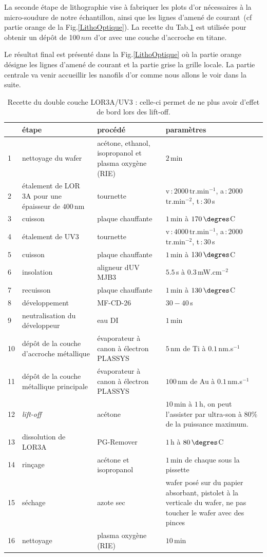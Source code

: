 La seconde étape de lithographie vise à fabriquer les plots d'or nécessaires à la micro-soudure de notre échantillon, ainsi que les lignes d'amené de courant~(cf partie orange de la Fig.\ref{LithoOptique}). La recette du Tab.\ref{tab_recette}  est utilisée pour obtenir un dép\^ot de 100$\,nm$ d'or avec une couche d'accroche en titane. 


Le résultat final est présenté dans la Fig.\ref{LithoOptique} où la partie orange désigne les lignes d'amené de courant et la partie grise la grille locale. La partie centrale va venir accueillir les nanofils d'or comme nous allons le voir dans la suite.



\begin{table}
\begin{center}
\begin{tabular}{|p{0.5cm}|p{4cm}|p{4cm}|p{3cm}|}
  \hline
\,& \textbf{étape} & \textbf{procédé} & \textbf{paramètres} \tabularnewline
\hline
1 &  nettoyage du wafer & acétone, ethanol, isopropanol et plasma oxygène (RIE)& $2\,$min \tabularnewline
\hline
 2 & étalement de LOR 3A pour une épaisseur de $400\,$nm& tournette & v\,:\,$2000\,$tr.min$^{-1}$, a\,:\,$2000\,$tr.min$^{-2}$, t\,:\,$30\,$s \tabularnewline
\hline
 3 & cuisson & plaque chauffante & $1\,$min à $170\,\degres$C \tabularnewline
\hline
4 & étalement de UV3 & tournette & v\,:\,$4000\,$tr.min$^{-1}$, a\,:\,$2000\,$tr.min$^{-2}$, t\,:\,$30\,$s \tabularnewline
\hline
5 & cuisson & plaque chauffante & $1\,$min à $130\,\degres$C \tabularnewline
\hline
6 & insolation & aligneur dUV MJB3 & $5.5\,$s à $0.3\,$mW.cm$^{-2}$\tabularnewline
\hline
7 & recuisson & plaque chauffante & $1\,$min à $130\,\degres$C \tabularnewline
\hline
8 & développement & MF-CD-26 & $30-40\,$s\tabularnewline
\hline
9 & neutralisation du développeur & eau DI & $1\,$min\tabularnewline
\hline
10 & dépôt de la couche d'accroche métallique & évaporateur à canon à électron PLASSYS & $5\,$nm de Ti à $0.1\,$nm.s$^{-1}$ \tabularnewline
\hline
11 & dépôt de la couche métallique principale & évaporateur à canon à électron PLASSYS & $100\,$nm de Au à $0.1\,$nm.s$^{-1}$ \tabularnewline
\hline
12 & \textit{lift-off} & acétone & $10\,$min à $1\,$h, on peut l'assister par ultra-son à $80\%$ de la puissance maximum. \tabularnewline
\hline
 13 & dissolution de LOR3A & PG-Remover & $1\,$h à $80\,\degres$C \tabularnewline
\hline
14 & rinçage & acétone et isopropanol & $1\,$min de chaque sous la pissette\tabularnewline
\hline
15 & séchage & azote sec & wafer posé sur du papier absorbant, pistolet à la verticale du wafer, ne pas toucher le wafer avec des pinces\tabularnewline
\hline
16 & nettoyage & plasma oxygène (RIE)& $10\,$min\tabularnewline
\hline
\end{tabular}
\caption{Recette du double couche LOR3A/UV3 : celle-ci permet de ne plus avoir d'effet de bord lors des lift-off.}
\label{tab_recette}
\end{center}
\end{table}







